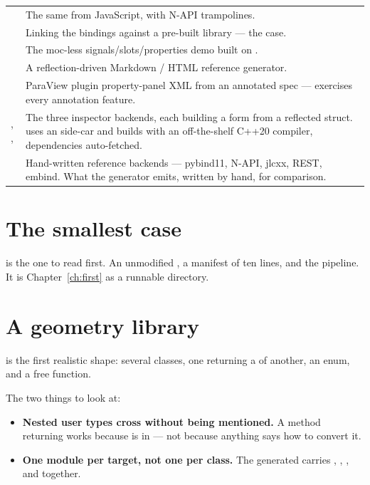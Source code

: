 \begin{center}
\begin{longtable}{@{}L{5.1cm}L{8.5cm}@{}}
\addlinespace
{} &
  The same from JavaScript, with N-API trampolines. \\
\addlinespace
{} &
  Linking the bindings against a pre-built library --- the 
  case. \\
\addlinespace
{} &
  The moc-less signals/slots/properties demo built on . \\
\addlinespace
{} &
  A reflection-driven Markdown / HTML reference generator. \\
\addlinespace
{} &
  ParaView plugin property-panel XML from an annotated 
  spec --- exercises every annotation feature. \\
\addlinespace
{}, ,  &
  The three inspector backends, each building a form from a reflected struct.
   uses an  side-car and builds with an
  off-the-shelf C++20 compiler, dependencies auto-fetched. \\
\addlinespace
{} &
  Hand-written reference backends --- pybind11, N-API, jlcxx, REST, embind.
  What the generator emits, written by hand, for comparison. \\
\bottomrule
\end{longtable}
\end{center}

\section{The smallest case}

 is the one to read first. An unmodified
, a manifest of ten lines, and the pipeline. It is
Chapter~\ref{ch:first} as a runnable directory.

\section{A geometry library}

 is the first realistic shape: several classes, one
returning a  of another, an enum, and a free function.

The two things to look at:

\begin{itemize}
  \item \textbf{Nested user types cross without being mentioned.} A
     method returning  works because
     is in  --- not because anything says how to
    convert it.
  \item \textbf{One module per target, not one per class.} The generated
     carries , , ,
     and  together.
\end{itemize}

